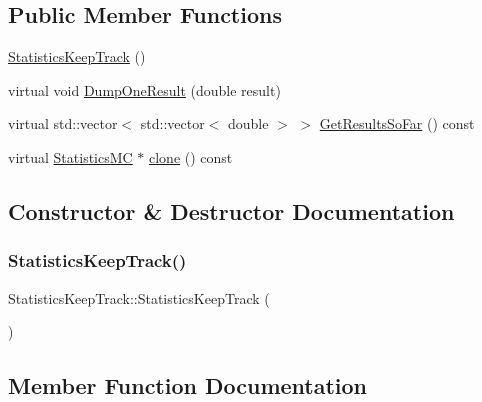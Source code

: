\subsection*{Public Member Functions}
\begin{DoxyCompactItemize}
\item 
\hyperlink{classStatisticsKeepTrack_a8f6656a1c8f65913a2a6727c5172d664}{Statistics\+Keep\+Track} ()
\item 
virtual void \hyperlink{classStatisticsKeepTrack_aaee86e9b5d2223f0c07725056cd55c8b}{Dump\+One\+Result} (double result)
\item 
virtual std\+::vector$<$ std\+::vector$<$ double $>$ $>$ \hyperlink{classStatisticsKeepTrack_a836a4a0d70daeef85410eff352d8fcf9}{Get\+Results\+So\+Far} () const
\item 
virtual \hyperlink{classStatisticsMC}{Statistics\+MC} $\ast$ \hyperlink{classStatisticsKeepTrack_a09c6aad9bb77548e267fe4f5ae7d99dd}{clone} () const
\end{DoxyCompactItemize}


\subsection{Constructor \& Destructor Documentation}
\hypertarget{classStatisticsKeepTrack_a8f6656a1c8f65913a2a6727c5172d664}{}\label{classStatisticsKeepTrack_a8f6656a1c8f65913a2a6727c5172d664} 
\subsubsection{\texorpdfstring{Statistics\+Keep\+Track()}{StatisticsKeepTrack()}}
{\footnotesize\ttfamily Statistics\+Keep\+Track\+::\+Statistics\+Keep\+Track (\begin{DoxyParamCaption}{ }\end{DoxyParamCaption})}



\subsection{Member Function Documentation}
\hypertarget{classStatisticsKeepTrack_a09c6aad9bb77548e267fe4f5ae7d99dd}{}\label{classStatisticsKeepTrack_a09c6aad9bb77548e267fe4f5ae7d99dd} 
